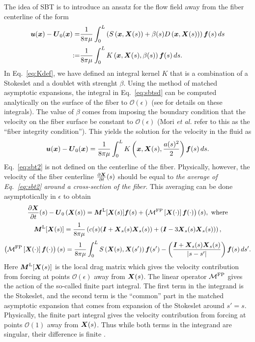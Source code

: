 The idea of SBT is to introduce an ansatz for the flow field away from the fiber centerline of the form
\begin{align}
\label{eq:sbtsd}
\boldsymbol{u}(\boldsymbol{x}) - \boldsymbol{U}_0(\boldsymbol{x}) = & \frac{1}{8\pi\mu} \int_0^L \left(S\left(\boldsymbol{x},\boldsymbol{X}(s)\right)+\beta(s)D\left(\boldsymbol{x},\boldsymbol{X}(s)\right)\right)\boldsymbol{f}(s) \, ds\\[2 pt] 
\label{eq:Kdef}
:= & \frac{1}{8\pi\mu} \int_0^L K\left(\boldsymbol{x},\boldsymbol{X}(s), \beta(s)\right)\boldsymbol{f}(s) \, ds. 
\end{align}
In Eq.\ \eqref{eq:Kdef}, we have defined an integral kernel $K$ that is a combination of a Stokeslet and a doublet with strenght $\beta$. Using the method of matched asymptotic expansions, the integral in Eq.\ \eqref{eq:sbtsd} can be computed analytically on the surface of the fiber to $\mathcal{O}(\epsilon)$ (see \cite{gotz2001interactions, koens2018boundary} for details on these integrals). The value of $\beta$ comes from imposing the boundary condition that the velocity on the fiber surface be constant to $\mathcal{O}(\epsilon)$ (Mori \textit{et al.} \cite{mori2018theoretical, morifree} refer to this as the ``fiber integrity condition''). This yields the solution for the velocity in the fluid as 
\begin{equation}
\label{eq:sbt2}
\boldsymbol{u}(\boldsymbol{x}) - \boldsymbol{U}_0(\boldsymbol{x}) =\frac{1}{8\pi\mu} \int_0^L  K\left(\boldsymbol{x},\boldsymbol{X}(s), \frac{a(s)^2}{2}\right)\boldsymbol{f}(s) \, ds. 
\end{equation}
Eq.\ \eqref{eq:sbt2} is not defined on the centerline of the fiber. Physically, however, the velocity of the fiber centerline $\frac{\partial \boldsymbol{X}}{\partial t}(s)$ should be equal to \textit{the average of Eq.\ \eqref{eq:sbt2} around a cross-section of the fiber}. This averaging can be done asymptotically in $\epsilon$ \cite{gotz2001interactions} to obtain 
\begin{gather}
\label{eq:onefib}
\frac{\partial \boldsymbol{X}}{\partial t}(s)-\boldsymbol{U}_0\left(\boldsymbol{X}(s)\right)= \boldsymbol{M}^\text{L}[\boldsymbol{X}(s)]\boldsymbol{f}(s) + \left(\mathcal{M}^\text{FP}\left[\boldsymbol{X}(\cdot)\right]\boldsymbol{f}(\cdot)\right)(s), \text{ where} \\[2 pt]
\label{eq:ML}
\boldsymbol{M}^\text{L}[\boldsymbol{X}(s)]= \frac{1}{8\pi\mu} \left(c(s)(\boldsymbol{I}+\boldsymbol{X}_s(s)\boldsymbol{X}_s(s)) +  (\boldsymbol{I}-3\boldsymbol{X}_s(s)\boldsymbol{X}_s(s))\right),\\[2 pt]
\label{eq:Mfp}
\left(\mathcal{M}^\text{FP}\left[\boldsymbol{X}(\cdot)\right]\boldsymbol{f}(\cdot)\right)(s) =  \frac{1}{8\pi\mu} \int_{0}^L S\left(\boldsymbol{X}(s),\boldsymbol{X}(s')\right) \boldsymbol{f}(s') -\left(\frac{\boldsymbol{I}+\boldsymbol{X}_s(s)\boldsymbol{X}_s(s)}{|s-s'|}\right) \boldsymbol{f}(s) \, ds'. 
\end{gather}
Here $\boldsymbol{M}^\text{L}[\boldsymbol{X}(s)]$ is the local drag matrix which gives the velocity contribution from forcing at points $\mathcal{O}(\epsilon)$ away from $\boldsymbol{X}(s)$.  The linear operator $\mathcal{M}^\text{FP}$ gives the action of the so-called finite part integral. The first term in the integrand is the Stokeslet, and the second term is the ``common'' part in the matched asymptotic expansion that comes from expansion of the Stokeslet around $s'=s$. Physically, the finite part integral gives the velocity contribution from forcing at points $\mathcal{O}(1)$ away from $\boldsymbol{X}(s)$. Thus while both terms in the integrand are singular, their difference is finite \cite{ts04}. 

